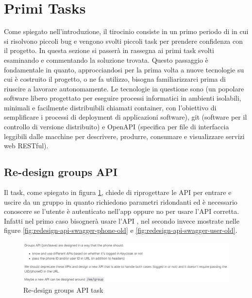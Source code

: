 \documentclass[main.tex]{subfiles}
\begin{document}
\sloppy

\section{Primi Tasks}\label{sec:Primi Tasks}
Come spiegato nell'introduzione, il tirocinio consiste in un primo periodo di  in cui si risolvono piccoli bug e vengono svolti piccoli task per prendere confidenza con il progetto. In questa sezione si passerà in rassegna ai primi task svolti esaminando e commentando la soluzione trovata. Questo passaggio è fondamentale in quanto, approcciandosi per la prima volta a nuove tecnologie su cui è costruito il progetto, o ne fa utilizzo, bisogna familiarizzarci prima di riuscire a lavorare autonomamente. Le tecnologie in questione sono  (un popolare software libero progettato per eseguire processi informatici in ambienti isolabili, minimali e facilmente distribuibili chiamati container, con l'obiettivo di semplificare i processi di deployment di applicazioni software\cite{docker}), git (software per il controllo di versione distribuito) e OpenAPI (specifica per file di interfaccia leggibili dalle macchine per descrivere, produrre, consumare e visualizzare servizi web RESTful).

\subsection{Re-design groups API}
Il task, come spiegato in figura \ref{fig:redesign-api-task}, chiede di riprogettare le API per entrare e uscire da un gruppo in quanto richiedono parametri ridondanti ed è necessario conoscere se l'utente è autenticato nell'app oppure no per usare l'API corretta. Infatti nel primo caso bisognerà usare l'API , nel secondo invece  mostrate nelle figure \ref{fig:redesign-api-swagger-phone-old} e \ref{fig:redesign-api-swagger-user-old}.
\begin{figure}[H]
    \centering
    \includegraphics[width=1\linewidth]{img/redesign-api-task/redesign-api-task.png}
    \caption{Re-design groups API task}
    \label{fig:redesign-api-task}
\end{figure}
\end{document}
